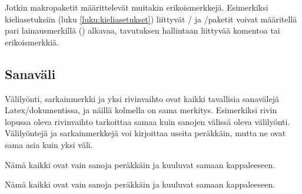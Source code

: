 
Jotkin makropaketit määrittelevät muitakin erikoismerkkejä. Esimerkiksi
kieliasetuksiin (luku \ref{luku:kieliasetukset}) liittyvät
\-/{} ja \-/paketit voivat
määritellä pari lainausmerkillä (\koodi{\textquotedbl}) alkavaa,
tavutuksen hallintaan liittyvää komentoa tai erikoismerkkiä.

\subsection{Sanaväli}
\label{luku:sanavali}

Välilyönti, sarkainmerkki ja yksi rivinvaihto ovat kaikki tavallisia
sanavälejä Latex\-/dokumentissa, ja näillä kolmella on sama merkitys.
Esimerkiksi rivin lopussa oleva rivinvaihto tarkoittaa samaa kuin
sanojen välissä oleva välilyönti. Välilyöntejä ja sarkainmerkkejä voi
kirjoittaa useita peräkkäin, mutta ne ovat sama asia kuin yksi väli.

\begin{koodilohkosis}
Nämä      kaikki
     ovat            vain
sanoja  peräkkäin  ja               kuuluvat
    samaan kappaleeseen.
\end{koodilohkosis}

\begin{tulossis}
  Nämä kaikki ovat vain sanoja peräkkäin ja kuuluvat samaan
  kappaleeseen.
\end{tulossis}

